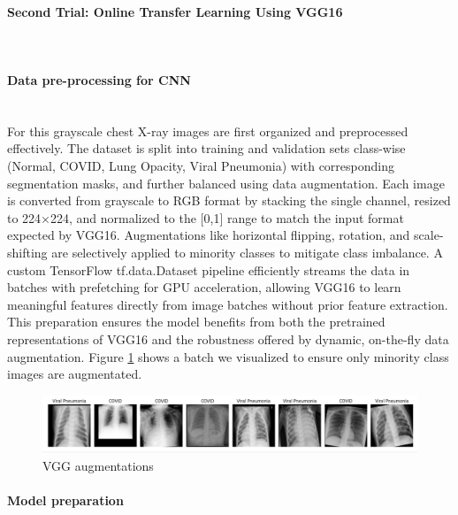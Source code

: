 \documentclass{article}
\begin{document}
\paragraph{Second Trial: Online Transfer Learning Using VGG16}\mbox{}\\
\paragraph{Data pre-processing for CNN}\mbox{}\\
 For this grayscale chest X-ray images are first organized and preprocessed effectively. The dataset is split into training and validation sets class-wise (Normal, COVID, Lung Opacity, Viral Pneumonia) with corresponding segmentation masks, and further balanced using data augmentation. Each image is converted from grayscale to RGB format by stacking the single channel, resized to 224×224, and normalized to the [0,1] range to match the input format expected by VGG16. Augmentations like horizontal flipping, rotation, and scale-shifting are selectively applied to minority classes to mitigate class imbalance. A custom TensorFlow tf.data.Dataset pipeline efficiently streams the data in batches with prefetching for GPU acceleration, allowing VGG16 to learn meaningful features directly from image batches without prior feature extraction. This preparation ensures the model benefits from both the pretrained representations of VGG16 and the robustness offered by dynamic, on-the-fly data augmentation.
Figure \ref{fig:vgg16augmentations.png} shows a batch we visualized to ensure only minority class images are augmentated.

\begin{figure}[h!] %
    \centering
    \includegraphics[width=1.0\linewidth]{vgg16augmentations.png}
    \caption{VGG augmentations}
    \label{fig:vgg16augmentations.png}
\end{figure}
\paragraph{Model preparation}\mbox{}\\
\end{document}
